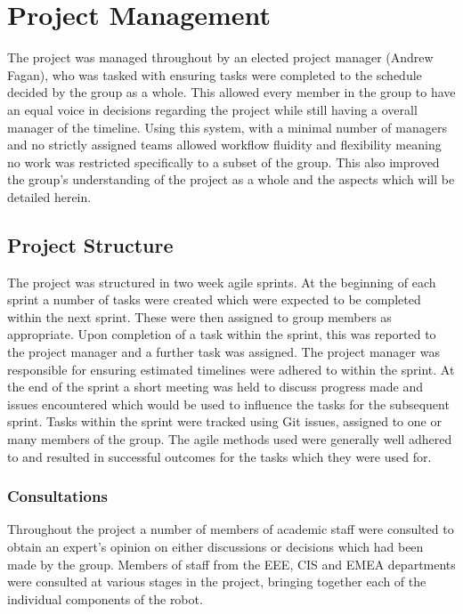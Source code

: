 \chapter{Project Management}\label{pm}

The project was managed throughout by an elected project manager 
(Andrew Fagan), who was tasked with ensuring tasks were 
completed to the schedule decided by the group as a whole. This 
allowed every member in the group to have an equal voice in 
decisions regarding the project while still having a overall 
manager of the timeline. Using this system, with a minimal 
number of managers and no strictly assigned teams allowed 
workflow fluidity and flexibility meaning no work was restricted 
specifically to a subset of the group. This also improved the 
group's understanding of the project as a whole and the aspects 
which will be detailed herein. 

\section{Project Structure}\label{pm/structure}

The project was structured in two week agile sprints. At the 
beginning of each sprint a number of tasks were created which 
were expected to be completed within the next sprint. These were 
then assigned to group members as appropriate. Upon completion 
of a task within the sprint, this was reported to the project 
manager and a further task was assigned. The project manager was 
responsible for ensuring estimated timelines were adhered to 
within the sprint. At the end of the sprint a short meeting was 
held to discuss progress made and issues encountered which would 
be used to influence the tasks for the subsequent sprint. Tasks 
within the sprint were tracked using Git issues, assigned to one 
or many members of the group. The agile methods used were 
generally well adhered to and 
resulted in successful outcomes for the tasks which they were 
used for. 
	

\subsection{Consultations}\label{pm/consultations}
Throughout the project a number of members of academic staff 
were consulted to obtain an expert's opinion on either 
discussions or decisions which had been made by the group. 
Members of staff from the EEE, CIS and EMEA departments were 
consulted at various stages in the project, bringing together 
each of the individual components of the robot. 

